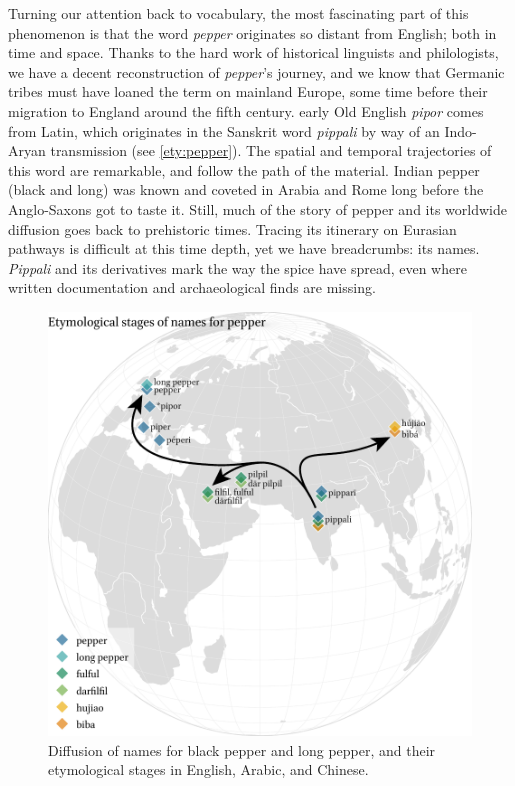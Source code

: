 Turning our attention back to vocabulary, the most fascinating part of this phenomenon is that the word \textit{pepper} originates so distant from English; both in time and space. Thanks to the hard work of historical linguists and philologists, we have a decent reconstruction of \textit{pepper}'s journey, and we know that Germanic tribes must have loaned the term on mainland Europe, some time before their migration to England around the fifth century. early Old English \textit{pipor} comes from Latin, which originates in the Sanskrit word \textit{pippali} by way of an Indo-Aryan transmission (see \ref{ety:pepper}). The spatial and temporal trajectories of this word are remarkable, and follow the path of the material. Indian pepper (black and long) was known and coveted in Arabia and Rome long before the Anglo-Saxons got to taste it. Still, much of the story of pepper and its worldwide diffusion goes back to prehistoric times. Tracing its itinerary on Eurasian pathways is difficult at this time depth, yet we have breadcrumbs: its names. \textit{Pippali} and its derivatives mark the way the spice have spread, even where written documentation and archaeological finds are missing.

\begin{figure}[!ht]
    \centering
    \includegraphics[width=\linewidth]{imgs/plots/diffusion_pepper_edited.pdf}
    \caption[Diffusion of names for pepper, and their etymological stages.]{Diffusion of names for black pepper and long pepper, and their etymological stages in English, Arabic, and Chinese.}
    \label{fig:diffusion_pepper}
\end{figure}

